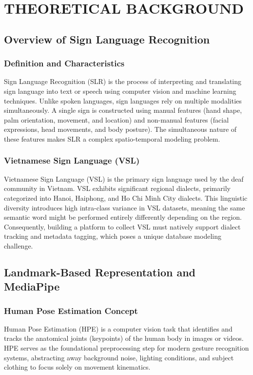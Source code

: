 \chapter{THEORETICAL BACKGROUND}

\section{Overview of Sign Language Recognition}
\subsection{Definition and Characteristics}
Sign Language Recognition (SLR) is the process of interpreting and translating sign language into text or speech using computer vision and machine learning techniques. Unlike spoken languages, sign languages rely on multiple modalities simultaneously. A single sign is constructed using manual features (hand shape, palm orientation, movement, and location) and non-manual features (facial expressions, head movements, and body posture). The simultaneous nature of these features makes SLR a complex spatio-temporal modeling problem.

\subsection{Vietnamese Sign Language (VSL)}
Vietnamese Sign Language (VSL) is the primary sign language used by the deaf community in Vietnam. VSL exhibits significant regional dialects, primarily categorized into Hanoi, Haiphong, and Ho Chi Minh City dialects. This linguistic diversity introduces high intra-class variance in VSL datasets, meaning the same semantic word might be performed entirely differently depending on the region. Consequently, building a platform to collect VSL must natively support dialect tracking and metadata tagging, which poses a unique database modeling challenge.

\section{Landmark-Based Representation and MediaPipe}
\subsection{Human Pose Estimation Concept}
Human Pose Estimation (HPE) is a computer vision task that identifies and tracks the anatomical joints (keypoints) of the human body in images or videos. HPE serves as the foundational preprocessing step for modern gesture recognition systems, abstracting away background noise, lighting conditions, and subject clothing to focus solely on movement kinematics.

